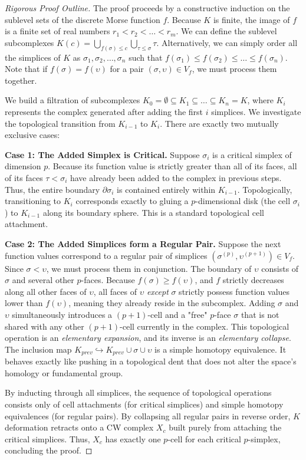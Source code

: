 \begin{proof}[Rigorous Proof Outline]
The proof proceeds by a constructive induction on the sublevel sets of the discrete Morse function $f$.
Because $K$ is finite, the image of $f$ is a finite set of real numbers $r_1 < r_2 < \dots < r_m$. We can define the sublevel subcomplexes $K(c) = \bigcup_{f(\sigma) \le c} \bigcup_{\tau \le \sigma} \tau$. Alternatively, we can simply order all the simplices of $K$ as $\sigma_1, \sigma_2, \dots, \sigma_n$ such that $f(\sigma_1) \le f(\sigma_2) \le \dots \le f(\sigma_n)$. Note that if $f(\sigma) = f(\upsilon)$ for a pair $(\sigma, \upsilon) \in V_f$, we must process them together.

We build a filtration of subcomplexes $K_0 = \emptyset \subseteq K_1 \subseteq \dots \subseteq K_n = K$, where $K_i$ represents the complex generated after adding the first $i$ simplices. We investigate the topological transition from $K_{i-1}$ to $K_i$. There are exactly two mutually exclusive cases:

\textbf{Case 1: The Added Simplex is Critical.}
Suppose $\sigma_i$ is a critical simplex of dimension $p$. Because its function value is strictly greater than all of its faces, all of its faces $\tau < \sigma_i$ have already been added to the complex in previous steps. Thus, the entire boundary $\partial \sigma_i$ is contained entirely within $K_{i-1}$. Topologically, transitioning to $K_i$ corresponds exactly to gluing a $p$-dimensional disk (the cell $\sigma_i$) to $K_{i-1}$ along its boundary sphere. This is a standard topological cell attachment.

\textbf{Case 2: The Added Simplices form a Regular Pair.}
Suppose the next function values correspond to a regular pair of simplices $(\sigma^{(p)}, \upsilon^{(p+1)}) \in V_f$. Since $\sigma < \upsilon$, we must process them in conjunction. The boundary of $\upsilon$ consists of $\sigma$ and several other $p$-faces. Because $f(\sigma) \ge f(\upsilon)$, and $f$ strictly decreases along all other faces of $\upsilon$, all faces of $\upsilon$ \emph{except} $\sigma$ strictly possess function values lower than $f(\upsilon)$, meaning they already reside in the subcomplex. 
Adding $\sigma$ and $\upsilon$ simultaneously introduces a $(p+1)$-cell and a "free" $p$-face $\sigma$ that is not shared with any other $(p+1)$-cell currently in the complex. This topological operation is an \emph{elementary expansion}, and its inverse is an \emph{elementary collapse}. The inclusion map $K_{prev} \hookrightarrow K_{prev} \cup \sigma \cup \upsilon$ is a simple homotopy equivalence. It behaves exactly like pushing in a topological dent that does not alter the space's homology or fundamental group.

By inducting through all simplices, the sequence of topological operations consists only of cell attachments (for critical simplices) and simple homotopy equivalences (for regular pairs). By collapsing all regular pairs in reverse order, $K$ deformation retracts onto a CW complex $X_c$ built purely from attaching the critical simplices. Thus, $X_c$ has exactly one $p$-cell for each critical $p$-simplex, concluding the proof.
\end{proof}

